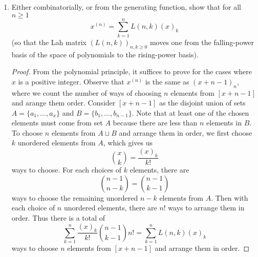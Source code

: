 \documentclass{article}
\begin{document}
\begin{enumerate}[label={(\alph*)}]
    \item Either combinatorially, or from the generating function, show
      that for all $n\geq1$
      \[x^{(n)} =\sum_{k=1}^n L(n,k)(x)_k\]
      (so that the Lah matrix $(L(n,k))_{n,k\geq0}$ moves one from the
      falling-power basis of the space of polynomials to the rising-power
      basis).

      \begin{proof}
        From the polynomial principle, it suffices to prove for the cases
        where $x$ is a positive integer.  Observe that $x^{(n)}$ is the
        same as $(x+n-1)_n$, where we count the number of ways of choosing
        $n$ elements from $[x+n-1]$ and arange them order. Consider
        $[x+n-1]$ as the disjoint union of sets $A=\{a_1,\ldots,a_{x}\}$
        and $B=\{b_1,\ldots,b_{n-1}\}$. Note that at least one of the chosen
        elements must come from set $A$ because there are less than $n$
        elements in $B$. \\

        To choose $n$ elements from $A\sqcup B$ and arrange them in order,
        we first choose $k$ unordered elements from $A$, which gives us
        \[\binom{x}{k} =\frac{(x)_k}{k!}\]
        ways to choose. For each choices of $k$ elements, there are
        \[\binom{n-1}{n-k} =\binom{n-1}{k-1}\]
        ways to choose the remaining unordered $n-k$ elements from $A$.
        Then with each choice of $n$ unordered elements, there are $n!$
        ways to arrange them in order. Thus there is a total of
        \[\sum_{k=1}^n \frac{(x)_k}{k!}\binom{n-1}{k-1} n! =\sum_{k=1}^n
        L(n,k)(x)_k\]
        ways to choose $n$ elements from $[x+n-1]$ and arrange them in
        order.
      \end{proof}
  \end{enumerate}
\end{document}
